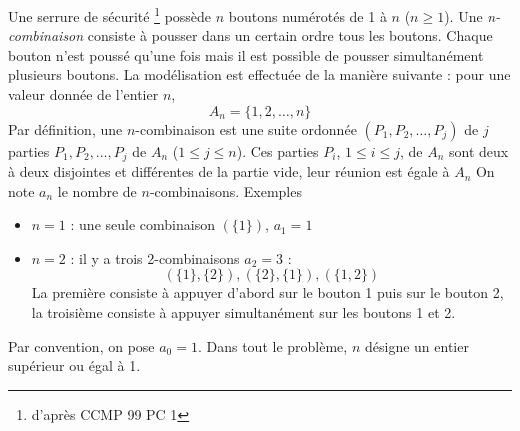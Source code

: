 Une serrure de s{\'e}curit{\'e} \footnote{d'apr{\`e}s CCMP 99 PC 1} poss{\`e}de
$n$ boutons num{\'e}rot{\'e}s de 1 {\`a} $n$ ($n\geq1$). Une
\emph{n-combinaison} consiste {\`a} pousser dans un certain ordre tous
les boutons. Chaque bouton n'est pouss{\'e} qu'une fois mais il est
possible de pousser simultan{\'e}ment plusieurs boutons. \newline La
mod{\'e}lisation est effectu{\'e}e de la mani{\`e}re suivante : pour une
valeur donn{\'e}e de l'entier $n$, $$A_{n}=\{1,2,\ldots,n\}$$ Par
d{\'e}finition, une $n$-combinaison est une suite ordonn{\'e}e
$(P_1,P_2,\ldots,P_j)$ de $j$ parties $ P_1,P_2,\ldots,P_j $ de
$A_n$ ($1\leq j\leq n$). Ces parties $P_i$, $1\leq i \leq j$, de
$A_n$ sont deux {\`a} deux disjointes et diff{\'e}rentes de la partie
vide, leur r{\'e}union est {\'e}gale {\`a} $A_n$ \newline On note $a_n$ le
nombre de $n$-combinaisons.\newline
 Exemples
\begin{itemize}
\item $n=1$ : une seule combinaison $(\{1\})$, $a_1=1$
\item $n=2$ : il y a trois 2-combinaisons $a_2=3$ :
$$(\{1\},\{2\}),(\{2\},\{1\}),(\{1,2\})$$
La premi{\`e}re consiste {\`a} appuyer d'abord sur le bouton 1 puis sur le bouton 2, la troisi{\`e}me consiste {\`a} appuyer simultan{\'e}ment sur les boutons 1 et 2.
\end{itemize}
Par convention, on pose $a_0=1$. Dans tout le probl{\`e}me, $n$ d{\'e}signe un entier sup{\'e}rieur ou {\'e}gal {\`a} 1.

